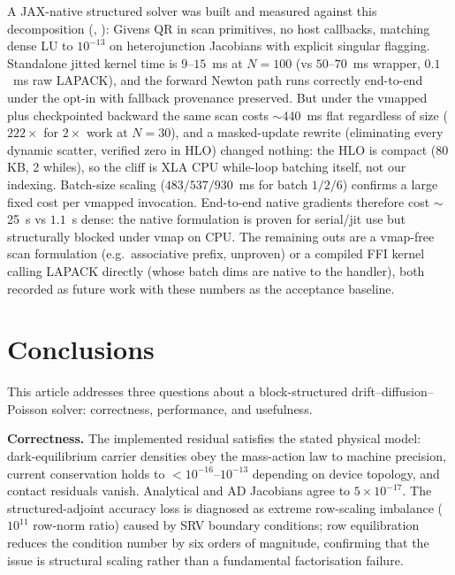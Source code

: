 A JAX-native structured solver was built and measured against this
decomposition (,
): Givens QR in 
scan primitives, no host callbacks, matching dense LU to $10^{-13}$ on
heterojunction Jacobians with explicit singular flagging. Standalone
jitted kernel time is $9$--$15$~ms at $N=100$ (vs $50$--$70$~ms wrapper,
$0.1$~ms raw LAPACK), and the forward Newton path runs correctly
end-to-end under the  opt-in with
fallback provenance preserved. But under the vmapped plus checkpointed
backward the same scan costs $\sim$440~ms flat regardless of size
($222\times$ for $2\times$ work at $N=30$), and a masked-update rewrite
(eliminating every dynamic scatter, verified zero
 in HLO) changed nothing: the HLO is
compact (80\,KB, 2 whiles), so the cliff is XLA CPU while-loop batching
itself, not our indexing. Batch-size scaling ($483/537/930$~ms for
batch $1/2/6$) confirms a large fixed cost per vmapped invocation.
End-to-end native gradients therefore cost $\sim$25~s vs $1.1$~s dense:
the native formulation is proven for serial/jit use but structurally
blocked under vmap on CPU. The remaining outs are a vmap-free scan
formulation (e.g.\ associative prefix, unproven) or a compiled FFI
kernel calling LAPACK directly (whose batch dims are native to the
handler), both recorded as future work with these numbers as the
acceptance baseline.

\section{Conclusions}\label{sec:conclusions}
This article addresses three questions about a block-structured
drift--diffusion--Poisson solver: correctness, performance, and
usefulness.

\textbf{Correctness.} The implemented residual satisfies the stated
physical model: dark-equilibrium carrier densities obey the mass-action
law to machine precision, current conservation holds to $<10^{-16}$--$10^{-13}$ depending on device topology,
and contact residuals vanish. Analytical and AD Jacobians agree to
$5\times10^{-17}$. The structured-adjoint accuracy loss is diagnosed as
extreme row-scaling imbalance ($10^{11}$ row-norm ratio) caused by
SRV boundary conditions; row equilibration reduces the condition number
by six orders of magnitude, confirming that the issue is structural
scaling rather than a fundamental factorisation failure.

